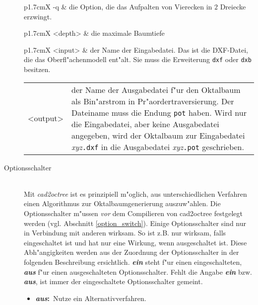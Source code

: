 \begin{description}
    \begin{tabularx}{\linewidth}{p{1.7cm}X}
	 -q       & die Option, die das Aufpalten von Vierecken in 
		    $2$ Dreiecke erzwingt. 
    \end{tabularx}
    \begin{tabularx}{\linewidth}{p{1.7cm}X}
	 <depth>  & die maximale Baumtiefe 
    \end{tabularx}
    \begin{tabularx}{\linewidth}{p{1.7cm}X}
	 <input>  & der Name der Eingabedatei. Das ist die DXF-Datei, die das
		    Oberfl"achenmodell ent"alt. Sie muss die Erweiterung 
		    \texttt{dxf} oder \texttt{dxb} besitzen. 
    \end{tabularx}
    \begin{tabularx}{\linewidth}{p{1.7cm}X}
         <output> & der Name der Ausgabedatei f"ur den Oktalbaum als 
		    Bin"arstrom in Pr"aordertraversierung. Der Dateiname muss 
		    die Endung \texttt{pot} haben. Wird nur die Eingabedatei, 
		    aber keine Ausgabedatei angegeben, wird der Oktalbaum zur 
		    Eingabedatei \emph{xyz}\texttt{.dxf} in die Ausgabedatei 
		    \emph{xyz}\texttt{.pot} geschrieben. 
    \end{tabularx}
\item[Optionsschalter]~\\ 
    Mit \emph{cad2octree} ist es prinzipiell m"oglich, aus unterschiedlichen 
    Verfahren einen Algorithmus zur Oktalbaumgenerierung auszuw"ahlen. 
    Die Optionsschalter m"ussen \emph{vor} dem Compilieren von cad2octree 
    festgelegt werden (vgl. Abschnitt \ref{option_switch}). 
    Einige Optionsschalter sind nur in Verbindung mit anderen wirksam. 
    So ist z.B.  nur wirksam, 
    falls  eingeschaltet ist und 
     hat nur eine Wirkung, wenn  
    ausgeschaltet ist. 
    Diese Abh"angigkeiten werden aus der Zuordnung der Optionsschalter 
    in der folgenden Beschreibung ersichtlich. \textbf{\emph{ein}} steht 
    f"ur einen eingeschalteten, \textbf{\emph{aus}} f"ur einen ausgeschalteten 
    Optionsschalter. Fehlt die Angabe \textbf{\emph{ein}} bzw. 
    \textbf{\emph{aus}}, ist immer der eingeschaltete Optionsschalter gemeint. 

    \newcommand*\option[1]{\textbf{\switch{#1}}}
    \newcommand*\opton{\textbf{\emph{ein}:}~}
    \newcommand*\optoff{\textbf{\emph{aus}:}~}
    \newcommand*\see{$\leadsto$ }

    \option{CLASSIC\_MODE}
    \begin{itemize}
    \item\optoff Nutze ein Alternativverfahren.
    

\end{itemize}
\end{description}
